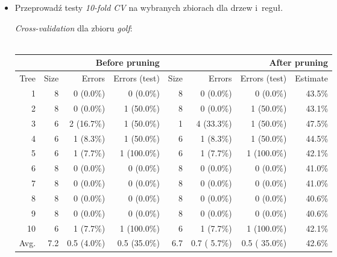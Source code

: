 \documentclass{article}
\begin{document}
\begin{itemize}
\item Przeprowadź testy \emph{10-fold CV} na wybranych zbiorach dla drzew i~reguł.


\emph{Cross-validation} dla zbioru \emph{golf}:\\\\
\begin{tabular}{|r||r|r|r||r|r|r|r|}
\hline
&\multicolumn{3}{1||}{Before pruning}&\multicolumn{4}{1|}{After pruning} \\
\hline
Tree  & Size & Errors        & Errors (test)  & Size & Errors        & Errors (test)  & Estimate \\
\hline\hline
    1 &    8 &    0 (0.0\%)  &    0 (0.0\%)   &    8 &    0 (0.0\%)  &    0 (0.0\%)   &  43.5\%  \\
    2 &    8 &    0 (0.0\%)  &    1 (50.0\%)  &    8 &    0 (0.0\%)  &    1 (50.0\%)  &  43.1\%  \\
    3 &    6 &    2 (16.7\%) &    1 (50.0\%)  &    1 &    4 (33.3\%) &    1 (50.0\%)  &  47.5\%  \\
    4 &    6 &    1 (8.3\%)  &    1 (50.0\%)  &    6 &    1 (8.3\%)  &    1 (50.0\%)  &  44.5\%  \\
    5 &    6 &    1 (7.7\%)  &    1 (100.0\%) &    6 &    1 (7.7\%)  &    1 (100.0\%) &  42.1\%  \\
    6 &    8 &    0 (0.0\%)  &    0 (0.0\%)   &    8 &    0 (0.0\%)  &    0 (0.0\%)   &  41.0\%  \\
    7 &    8 &    0 (0.0\%)  &    0 (0.0\%)   &    8 &    0 (0.0\%)  &    0 (0.0\%)   &  41.0\%  \\
    8 &    8 &    0 (0.0\%)  &    0 (0.0\%)   &    8 &    0 (0.0\%)  &    0 (0.0\%)   &  40.6\%  \\
    9 &    8 &    0 (0.0\%)  &    0 (0.0\%)   &    8 &    0 (0.0\%)  &    0 (0.0\%)   &  40.6\%  \\
   10 &    6 &    1 (7.7\%)  &    1 (100.0\%) &    6 &    1 (7.7\%)  &    1 (100.0\%) &  42.1\%  \\
\hline\hline
 Avg. &  7.2 &  0.5 (4.0\%)  &  0.5 (35.0\%) &  6.7 &  0.7 (  5.7\%) &  0.5 ( 35.0\%) &  42.6\%  \\
\hline
\end{tabular}


\end{itemize}
\end{document}
